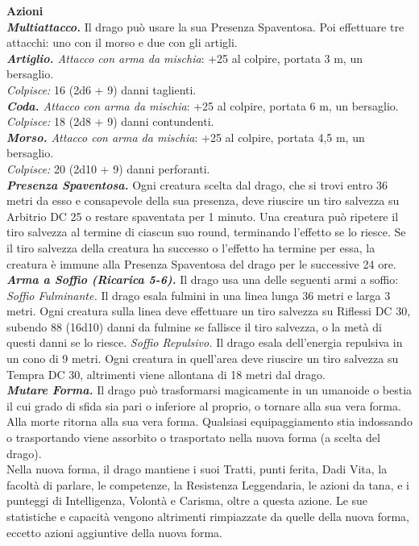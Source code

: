 \begin{multicols}{2}
\smallskip\textbf{Azioni}\\
\emph{\textbf{Multiattacco.}} Il drago può usare la sua Presenza Spaventosa. Poi effettuare tre attacchi: uno con il morso e due con gli artigli.\\
\emph{\textbf{Artiglio.} Attacco con arma da mischia}: +25 al colpire, portata 3 m, un bersaglio.\\
\emph{Colpisce:} 16 (2d6 + 9) danni taglienti.\\
\emph{\textbf{Coda.} Attacco con arma da mischia}: +25 al colpire, portata 6 m, un bersaglio.\\
\emph{Colpisce:} 18 (2d8 + 9) danni contundenti.\\
\emph{\textbf{Morso.} Attacco con arma da mischia}: +25 al colpire, portata 4,5 m, un bersaglio.\\
\emph{Colpisce:} 20 (2d10 + 9) danni perforanti.\\
\emph{\textbf{Presenza Spaventosa.}} Ogni creatura scelta dal drago, che si trovi entro 36 metri da esso e consapevole della sua presenza, deve riuscire un tiro salvezza su Arbitrio DC  25 o restare spaventata per 1 minuto. Una creatura può ripetere il tiro salvezza al termine di ciascun suo round, terminando l'effetto se lo riesce. Se il tiro salvezza della creatura ha successo o l'effetto ha termine per essa, la creatura è immune alla Presenza Spaventosa del drago per le successive 24 ore.\\
\emph{\textbf{Arma a Soffio (Ricarica 5-6).}} Il drago usa una delle seguenti armi a soffio:\\
\emph{Soffio Fulminante.} Il drago esala fulmini in una linea lunga 36 metri e larga 3 metri. Ogni creatura sulla linea deve effettuare un tiro salvezza su Riflessi DC  30, subendo 88 (16d10) danni da fulmine se fallisce il tiro salvezza, o la metà di questi danni se lo riesce. \emph{Soffio Repulsivo.} Il drago esala dell'energia repulsiva in un cono di 9 metri. Ogni creatura in quell'area deve riuscire un tiro salvezza su Tempra DC  30, altrimenti viene allontana di 18 metri dal drago.\\
\emph{\textbf{Mutare Forma.}} Il drago può trasformarsi magicamente in un umanoide o bestia il cui grado di sfida sia pari o inferiore al proprio, o tornare alla sua vera forma. Alla morte ritorna alla sua vera forma. Qualsiasi equipaggiamento stia indossando o trasportando viene assorbito o trasportato nella nuova forma (a scelta del drago).\\
Nella nuova forma, il drago mantiene i suoi Tratti, punti ferita, Dadi Vita, la facoltà di parlare, le competenze, la Resistenza Leggendaria, le azioni da tana, e i punteggi di Intelligenza, Volontà e Carisma, oltre a questa azione. Le sue statistiche e capacità vengono altrimenti rimpiazzate da quelle della nuova forma, eccetto azioni aggiuntive della nuova forma.\\

\end{multicols}
